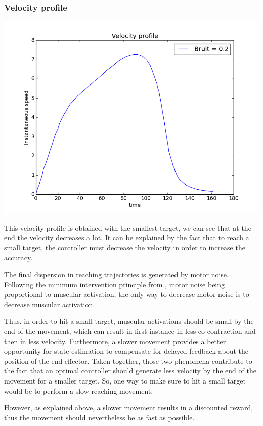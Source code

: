 \documentclass[pdftex,a4paper,12pt]{report}
\begin{document}
\subsubsection{Velocity profile}
\begin{center}
\includegraphics[scale=0.5]{figures/velocityProfileTreachSize0p02.png}
\end{center}
This velocity profile is obtained with the smallest target, we can see that at the end the velocity decreases a lot. It can be explained by the fact that to reach a small target, the controller must decrease the velocity in order to increase the accuracy.

The final dispersion in reaching trajectories is generated by motor noise.
Following the minimum intervention principle from \cite{todorov02_NN}, motor noise being proportional to muscular activation, the only way to decrease motor noise is to decrease muscular activation.

Thus, in order to hit a small target, muscular activations should be small
by the end of the movement, which can result in first instance in less co-contraction and then in less velocity. Furthermore, a slower movement provides a better opportunity for state estimation to compensate for delayed feedback about the position of the end effector. Taken together, those two phenomena contribute to the fact that an optimal controller should generate less velocity by the end of the movement for a smaller target.
So, one way to make sure to hit a small target would be to perform a slow reaching movement.

However, as explained above, a slower movement results in a discounted reward,
thus the movement should nevertheless be as fast as possible.
\end{document}
